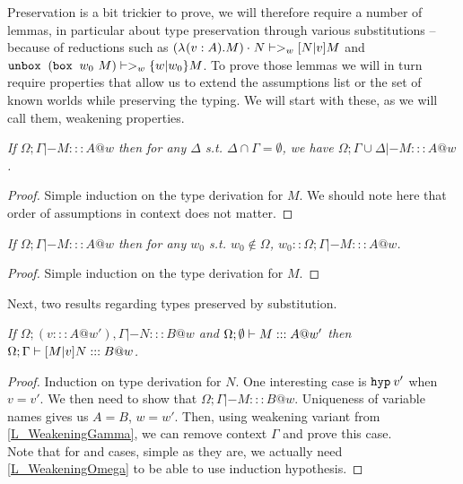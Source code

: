 Preservation is a bit trickier to prove, we will therefore require a number of lemmas, in particular about type preservation through various substitutions -- because of reductions such as $\mbox{$(\mbox{$\lambda_{} (v: A). M$}) \cdot_{} N$} |->_w \mbox{$ [N | v] M$}$ and $\mbox{$\operatorname{\texttt{unbox}}_{}\ {(}$}\mbox{$\operatorname{\texttt{box}}_{}\ {w_0}\ {M}$}) |->_w \mbox{$ \{w | w_0 \} M$}$. To prove those lemmas we will in turn require properties that allow us to extend the assumptions list or the set of known worlds while preserving the typing. We will start with these, as we will call them, weakening properties.

\begin{property}\em
\label{L_WeakeningGamma}
If $\Omega; \Gamma |- M ::: A @ w$ then for any $\Delta$ s.t. $\Delta \cap \Gamma = \emptyset$, we have $\Omega; \Gamma \cup \Delta |- M ::: A @ w$.
\begin{proof}
Simple induction on the type derivation for $M$. We should note here that order of assumptions in context does not matter.
\end{proof}
\end{property}

\begin{property}\em
\label{L_WeakeningOmega}
If $\Omega; \Gamma |- M ::: A @ w$ then for any $w_0$ s.t. $w_0 \notin \Omega$, $w_0::\Omega; \Gamma |- M ::: A @ w$.
\begin{proof}
Simple induction on the type derivation for $M$.
\end{proof}
\end{property}

Next, two results regarding types preserved by substitution.
\begin{lemma}
\label{L_SubstTPreserv}\em
If $\Omega; (v ::: A @ w'), \Gamma |- N ::: B @ w$ and $\Omega; \mbox{$\emptyset$} |- M ::: A @ w'$ then\\
$\Omega; \Gamma |- \mbox{$ [M | v] N$} ::: B @ w$.
\begin{proof}
Induction on type derivation for $N$. One interesting case is $\mbox{$\operatorname{\texttt{hyp}}_{} {v'}$}$ when $v = v'$. We then need to show that $\Omega; \Gamma |- M ::: B @ w$. Uniqueness of variable names gives us $A =B$, $w= w'$. Then, using weakening variant from \ref{L_WeakeningGamma}, we can remove context $\Gamma$ and prove this case.\\
Note that for \bboxe{}{} and  cases, simple as they are, we actually need \ref{L_WeakeningOmega} to be able to use induction hypothesis.
\end{proof}
\end{lemma}

